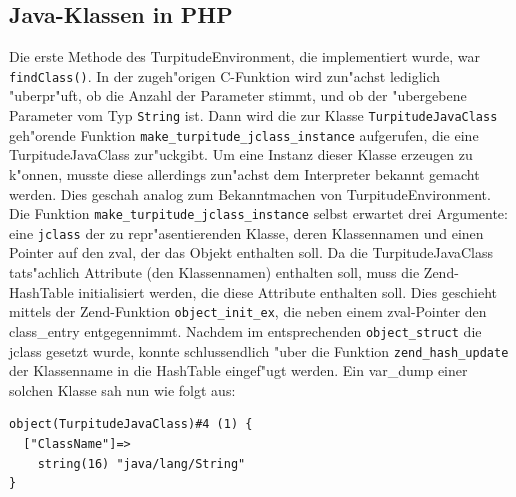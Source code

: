 \subsection{Java-Klassen in PHP}
\label{sec:chap1:impl:4}

Die erste Methode des TurpitudeEnvironment, die implementiert wurde, war \texttt{findClass()}. In der zugeh"origen C-Funktion wird zun"achst 
lediglich "uberpr"uft, ob die Anzahl der Parameter stimmt, und ob der "ubergebene Parameter vom Typ \texttt{String} ist. Dann wird die
zur Klasse \texttt{TurpitudeJavaClass} geh"orende Funktion \texttt{make\_turpitude\_jclass\_instance} aufgerufen, die eine TurpitudeJavaClass
zur"uckgibt. Um eine Instanz dieser
Klasse erzeugen zu k"onnen, musste diese allerdings zun"achst dem Interpreter bekannt gemacht werden. Dies geschah analog zum Bekanntmachen
von TurpitudeEnvironment. Die Funktion \texttt{make\_turpitude\_jclass\_instance} selbst erwartet drei Argumente: eine \texttt{jclass} der zu
repr"asentierenden Klasse, deren Klassennamen und einen Pointer auf den zval, der das Objekt enthalten soll. Da die TurpitudeJavaClass 
tats"achlich Attribute (den Klassennamen) enthalten soll, muss die Zend-HashTable initialisiert werden, die diese Attribute enthalten soll.
Dies geschieht mittels der Zend-Funktion \texttt{object\_init\_ex}, die neben einem zval-Pointer den class\_entry entgegennimmt.
Nachdem im entsprechenden \texttt{object\_struct} die jclass gesetzt wurde, konnte schlussendlich "uber die Funktion \texttt{zend\_hash\_update} 
der Klassenname in die HashTable eingef"ugt werden. Ein var\_dump einer solchen Klasse sah nun wie folgt aus:

\begin{lstlisting}[caption=Dump einer TurpitudeJavaClass]
object(TurpitudeJavaClass)#4 (1) {
  ["ClassName"]=>
    string(16) "java/lang/String"
}
\end{lstlisting}


